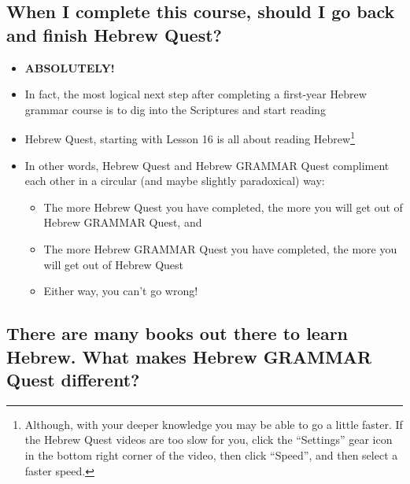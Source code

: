 \documentclass[
]{turabian-researchpaper}
\providecommand{\tightlist}{%
  \setlength{\itemsep}{0pt}\setlength{\parskip}{0pt}}
\begin{document}
\hypertarget{when-i-complete-this-course-should-i-go-back-and-finish-hebrew-quest}{%
\subsection*{When I complete this course, should I go back and finish Hebrew Quest?}\label{when-i-complete-this-course-should-i-go-back-and-finish-hebrew-quest}}

\begin{itemize}
\tightlist
\item
  \textbf{ABSOLUTELY!}
\item
  In fact, the most logical next step after completing a first-year Hebrew grammar course is to dig into the Scriptures and start reading\\
\item
  Hebrew Quest, starting with Lesson 16 is all about reading Hebrew\footnote{Although, with your deeper knowledge you may be able to go a little faster. If the Hebrew Quest videos are too slow for you, click the ``Settings'' gear icon in the bottom right corner of the video, then click ``Speed'', and then select a faster speed.}
\item
  In other words, Hebrew Quest and Hebrew GRAMMAR Quest compliment each other in a circular (and maybe slightly paradoxical) way:

  \begin{itemize}
  \tightlist
  \item
    The more Hebrew Quest you have completed, the more you will get out of Hebrew GRAMMAR Quest, and
  \item
    The more Hebrew GRAMMAR Quest you have completed, the more you will get out of Hebrew Quest
  \item
    Either way, you can't go wrong!
  \end{itemize}
\end{itemize}

\hypertarget{there-are-many-books-out-there-to-learn-hebrew.-what-makes-hebrew-grammar-quest-different}{%
\subsection*{There are many books out there to learn Hebrew. What makes Hebrew GRAMMAR Quest different?}\label{there-are-many-books-out-there-to-learn-hebrew.-what-makes-hebrew-grammar-quest-different}}
\end{document}
